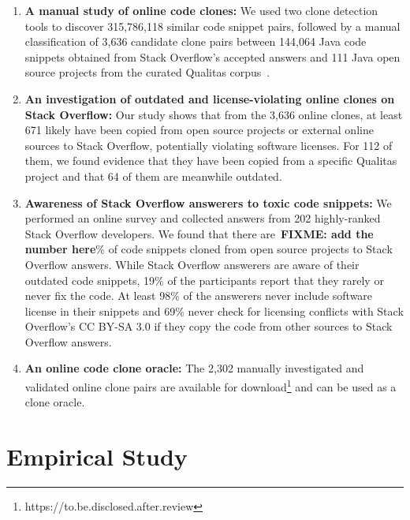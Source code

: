\documentclass[10pt,journal,compsoc]{IEEEtran}
\newcommand\FIXME[1]{{\color{red}\textbf{FIXME: #1}}}
\begin{document}
\begin{enumerate} 
	\item \textbf{A manual study of online code clones:} We used
	two clone detection tools to discover 315,786,118 similar code snippet pairs,
	followed by a manual classification of 3,636 candidate clone pairs between
	144,064 Java code snippets obtained from Stack Overflow's accepted answers and
	111 Java open source projects from the curated Qualitas
	corpus~\cite{QualitasCorpus}. 
	
	\item \textbf{An investigation of outdated and
		license-violating online clones on Stack Overflow:} Our study shows that from
	the 3,636 online clones, at least 671 likely have been copied from open source
	projects or external online sources to Stack Overflow, potentially violating
	software licenses. For 112 of them, we found evidence that they have been copied
	from a specific Qualitas project and that 64 of them are meanwhile outdated. %
	
	\item \textbf{Awareness of Stack Overflow answerers to
	toxic code snippets:} We performed an online survey and collected answers from
	202 highly-ranked Stack Overflow developers. We found that there are~\FIXME{add
	the number here}\% of code snippets cloned from open source projects to Stack
	Overflow answers. While Stack Overflow answerers are aware of their outdated
	code snippets, 19\% of the participants report that they rarely or never fix
	the code. At least 98\% of the answerers never include software license in
	their snippets and 69\% never check for licensing conflicts with Stack
	Overflow's CC BY-SA 3.0 if they copy the code from other sources to Stack
	Overflow answers.
	
	\item \textbf{An online code
		clone oracle:} The 2,302 manually investigated and validated online clone pairs
	are available for download\footnote{https://to.be.disclosed.after.review} and
	can be used as a clone oracle. \end{enumerate}

\section{Empirical Study}
\end{document}
